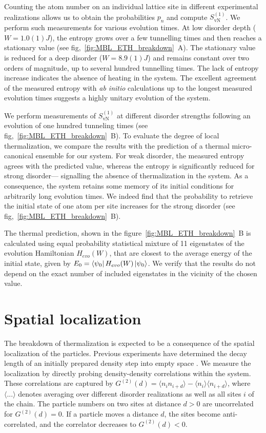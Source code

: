 Counting the atom number on an individual lattice site in different experimental realizations allows us to obtain the probabilities $p_n$ and compute $S_\text{vN}^{(1)}$. We perform such measurements for various evolution times. At low disorder depth ($W=1.0(1)J$), the entropy grows over a few tunnelling times and then reaches a stationary value (see fig,~\ref{fig:MBL_ETH_breakdown}~A). The stationary value is reduced for a deep disorder ($W=8.9(1)J$) and remains constant over two orders of magnitude, up to several hundred tunnelling times. The lack of entropy increase indicates the absence of heating in the system. The excellent agreement of the measured entropy with \textit{ab initio} calculations up to the longest measured evolution times suggests a highly unitary evolution of the system.

We perform measurements of $S_\text{vN}^{(1)}$ at different disorder strengths following an evolution of one hundred tunneling times (see fig,~\ref{fig:MBL_ETH_breakdown}~B). To evaluate the degree of local thermalization, we compare the results with the prediction of a thermal micro-canonical ensemble for our system. For weak disorder, the measured entropy agrees with the predicted value, whereas the entropy is significantly reduced for strong disorder--- signalling the absence of thermalization in the system. As a consequence, the system retains some memory of its initial conditions for arbitrarily long evolution times. We indeed find that the probability to retrieve the initial state of one atom per site increases for the strong disorder (see fig,~\ref{fig:MBL_ETH_breakdown}~B).

The thermal prediction, shown in the figure~\ref{fig:MBL_ETH_breakdown}~B is calculated using equal probability statistical mixture of 11 eigenstates of the evolution Hamiltonian $H_{evo}(W)$, that are closest to the average energy of the initial state, given by $E_0=\left\langle \psi_0\right|H_{evo}(W)\left|\psi_0\right\rangle$. We verify that the results do not depend on the exact number of included eigenstates in the vicinity of the chosen value.  

\section{Spatial localization}

The breakdown of thermalization is expected to be a consequence of the spatial localization of the particles. Previous experiments have determined the decay length of an initially prepared density step into empty space \cite{Choi2016}. We measure the localization by directly probing density-density correlations within the system. These correlations are captured by $G^{(2)}(d)=\langle n_{i} n_{i+d} \rangle - \langle n_{i}\rangle \langle n_{i+d}\rangle$, where $\langle...\rangle$ denotes averaging over different disorder realizations as well as all sites $i$ of the chain. The particle numbers on two sites at distance $d>0$ are uncorrelated for $G^{(2)}(d)=0$. If a particle moves a distance $d$, the sites become anti-correlated, and the correlator decreases to $G^{(2)}(d)<0$. 

